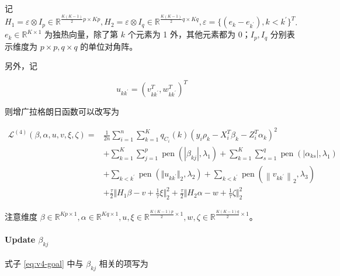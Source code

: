 \documentclass[12pt, a4paper, oneside]{article}
\numberwithin{equation}{section}
\begin{document}
记 $H_1 = \varepsilon \otimes I_p \in \mathbb{R}^{\frac{K(K-1)}{2}p\times Kp}, H_2 = \varepsilon \otimes I_q \in \mathbb{R}^{\frac{K(K-1)}{2}q\times Kq}, \varepsilon = \{(e_k - e_{k^\prime}), k < {k^\prime}\}^T$. $e_k\in\mathbb{R}^{K\times 1}$ 为独热向量，除了第 $k$ 个元素为 1 外，其他元素都为 0；$I_p,I_q$ 分别表示维度为 $p\times p, q\times q$ 的单位对角阵。

另外，记

\begin{equation}
u_{k{k^\prime}} = (v^T_{kk^\prime}, w^T_{kk^\prime})^T
\end{equation}

则增广拉格朗日函数可以改写为

\begin{equation}
	\begin{aligned}
		\mathcal{L}^{(4)}(\beta,\alpha,u,v,\xi,\zeta)=&\frac{1}{2n}\sum_{i=1}^{n}\sum_{k=1}^{K} q_{C_i}(k)\left(y_i\rho_k - X_i^T \beta_k - Z_i^T \alpha_k \right)^2 \\
		&+ \sum_{k=1}^{K}\sum_{j=1}^{p} \operatorname{pen}\left(|\beta_{kj}|, \lambda_{1}\right) + \sum_{k=1}^{K}\sum_{s=1}^{q} \operatorname{pen}\left(|\alpha_{ks}|, \lambda_{1}\right)\\
		&+ \sum_{k<k^{\prime}} \operatorname{pen}\left(\Vert u_{kk^\prime}\Vert_2, \lambda_{2}\right) + \sum_{k<k^{\prime}} \operatorname{pen}\left(\left\|v_{kk^\prime}\right\|_{2}, \lambda_{3}\right) \\
		&+ \frac{\tau}{2}\Vert H_1 \beta - v + \frac{1}{\tau}\xi\Vert_2^2 + \frac{\tau}{2}\Vert H_2 \alpha - w + \frac{1}{\tau}\zeta\Vert_2^2
	\end{aligned}
\label{eq:v4-goal}
\end{equation}

注意维度 $\beta \in \mathbb{R}^{Kp\times 1}, \alpha \in \mathbb{R}^{Kq\times 1}, u, \xi \in \mathbb{R}^{\frac{K(K-1)p}{2}\times 1} , w, \zeta \in \mathbb{R}^{\frac{K(K-1)q}{2}\times 1}$。

\paragraph{Update $\beta_{kj}$}

式子 \ref{eq:v4-goal} 中与 $\beta_{kj}$ 相关的项写为
\end{document}
